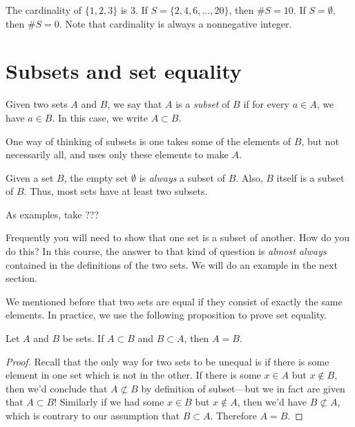 \documentclass{tufte-book}
\begin{document}
The cardinality of $\{1, 2, 3\}$ is 3. If $S = \{2, 4, 6, \dots, 20\}$, then $\# S = 10$. If $S = \emptyset$, then $\# S = 0$. Note that cardinality is always a nonnegative integer. 

\section{Subsets and set equality}
\label{sec:subsets}

\begin{definition}
  Given two sets $A$ and $B$, we say that $A$ is a \emph{subset}  of $B$ if for every $a \in A$, we have $a \in B$. In this case, we write $A \subset B$. 
\end{definition}
One way of thinking of subsets is one takes some of the elements of $B$, but not necessarily all, and uses only these elements to make $A$.

Given a set $B$, the empty set $\emptyset$ is \emph{always} a subset of $B$. Also, $B$ itself is a subset of $B$. Thus, most sets have at least two subsets.

As examples, take ???

Frequently you will need to show that one set is a subset of another. How do you do this? In this course, the answer to that kind of question is \emph{almost always} contained in the definitions of the two sets. We will do an example in the next section.

We mentioned before that two sets are equal if they consist of exactly the same elements. In practice, we use the following proposition to prove set equality.
\begin{proposition}
  Let $A$ and $B$ be sets. If $A \subset B$ and $B \subset A$, then $A = B$. 
\end{proposition}

\begin{proof}
  Recall that the only way for two sets to be unequal is if there is some element in one set which is not in the other. If there is some $x \in A$ but $x \notin B$, then we'd conclude that $A \not\subset B$ by definition of subset---but we in fact are given that $A \subset B$! Similarly if we had some $x \in B$ but $x \notin A$, then we'd have $B \not\subset A$, which is contrary to our assumption that $B \subset A$. Therefore $A = B$.
\end{proof}
\end{document}
